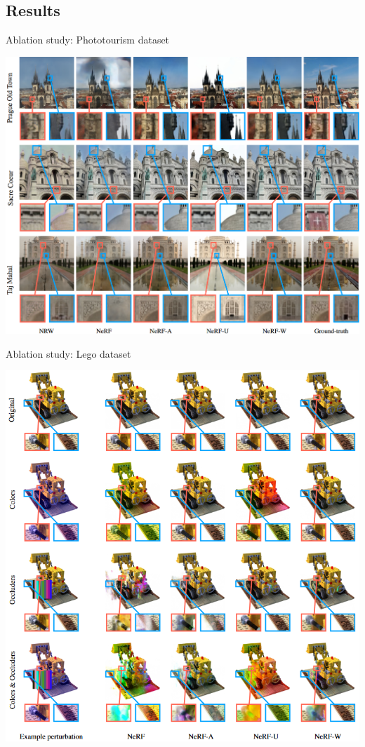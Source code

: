 \documentclass[aspectratio=1610]{beamer}
\begin{document}
\subsection{Results}
\begin{frame}{Ablation study: Phototourism dataset}
    \begin{center}
        \includegraphics[width=.69\textwidth]{res-photo.png}
    \end{center}
\end{frame}
\begin{frame}{Ablation study: Lego dataset}
    \begin{center}
        \includegraphics[width=.51\textwidth]{results-lego.png}
    \end{center}
\end{frame}
\end{document}
